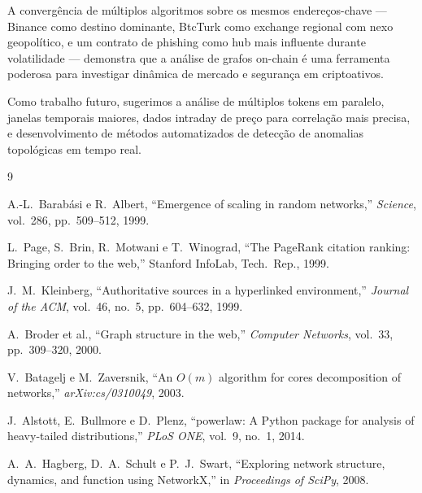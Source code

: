 \documentclass[12pt,a4paper]{article}
\begin{document}
A convergência de múltiplos algoritmos sobre os mesmos endereços-chave --- Binance como destino dominante, BtcTurk como exchange regional com nexo geopolítico, e um contrato de phishing como hub mais influente durante volatilidade --- demonstra que a análise de grafos on-chain é uma ferramenta poderosa para investigar dinâmica de mercado e segurança em criptoativos.

Como trabalho futuro, sugerimos a análise de múltiplos tokens em paralelo, janelas temporais maiores, dados intraday de preço para correlação mais precisa, e desenvolvimento de métodos automatizados de detecção de anomalias topológicas em tempo real.

\begin{thebibliography}{9}

A.-L.\ Barabási e R.\ Albert, ``Emergence of scaling in random networks,'' \textit{Science}, vol.~286, pp.~509--512, 1999.

L.\ Page, S.\ Brin, R.\ Motwani e T.\ Winograd, ``The PageRank citation ranking: Bringing order to the web,'' Stanford InfoLab, Tech.\ Rep., 1999.

J.\ M.\ Kleinberg, ``Authoritative sources in a hyperlinked environment,'' \textit{Journal of the ACM}, vol.~46, no.~5, pp.~604--632, 1999.

A.\ Broder et al., ``Graph structure in the web,'' \textit{Computer Networks}, vol.~33, pp.~309--320, 2000.

V.\ Batagelj e M.\ Zaversnik, ``An $O(m)$ algorithm for cores decomposition of networks,'' \textit{arXiv:cs/0310049}, 2003.

J.\ Alstott, E.\ Bullmore e D.\ Plenz, ``powerlaw: A Python package for analysis of heavy-tailed distributions,'' \textit{PLoS ONE}, vol.~9, no.~1, 2014.

A.\ A.\ Hagberg, D.\ A.\ Schult e P.\ J.\ Swart, ``Exploring network structure, dynamics, and function using NetworkX,'' in \textit{Proceedings of SciPy}, 2008.

\end{thebibliography}
\end{document}
